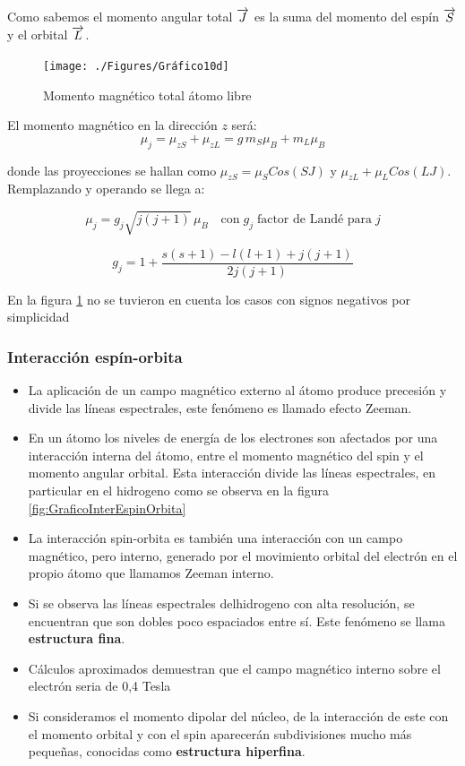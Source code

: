 Como sabemos el momento angular total $\overrightarrow{J}$ es la suma del momento del espín $\overrightarrow{S}$ y el orbital $\overrightarrow{L}$.

\begin{figure}[H]
    \centering
    \texttt{[image: ./Figures/Gráfico10d]}
	\caption{Momento magnético total átomo libre}
	\label{fig:Grafico10d}
\end{figure}


El momento magnético en la dirección $z$ será:
\begin{equation}
	\mu_{j} = \mu_{zS}+\mu_{zL} = g\,m_{S}\mu_{B}+m_{L}\mu_{B}
\end{equation}

donde las proyecciones se hallan como $\mu_{zS}=\mu_{S}Cos(SJ)$ y $\mu_{zL}+\mu_{L}Cos(LJ)$. Remplazando y operando se llega a:

\begin{equation}
	\mu_{j} = g_{j}\sqrt{j(j+1)}\,\mu_{B} \quad \text{con} \; g_{j}\;  \text{factor de Landé para}\; j    
\end{equation}

\begin{equation}
	g_{j} = 1 + \frac{s(s+1)-l(l+1)+j(j+1)}{2j(j+1)}
\end{equation}

En la figura \ref{fig:Grafico10d} no se tuvieron en cuenta los casos con signos negativos por simplicidad

\subsubsection{Interacción espín-orbita}

\begin{itemize}
	\item La aplicación de un campo magnético externo al átomo produce precesión y divide las líneas espectrales, este fenómeno es llamado efecto Zeeman.
	\item En un átomo los niveles de energía de los electrones son afectados por una interacción interna del átomo, entre el momento magnético del spin y el momento angular orbital. Esta interacción divide las líneas espectrales, en particular en el hidrogeno como se observa en la figura \ref{fig:GraficoInterEspinOrbita}
	\item La interacción spin-orbita es también una interacción con un campo magnético, pero interno, generado por el movimiento orbital del electrón en el propio átomo que llamamos Zeeman interno.
	\item Si se observa las líneas espectrales delhidrogeno con alta resolución, se encuentran que son dobles poco espaciados entre sí. Este fenómeno se llama \textbf{estructura fina}.
	\item Cálculos aproximados demuestran que el campo magnético interno sobre el electrón seria de 0,4 Tesla
	\item Si consideramos el momento dipolar del núcleo, de la interacción de este con el momento orbital y con el spin aparecerán subdivisiones mucho más pequeñas, conocidas como \textbf{estructura hiperfina}.
	
\end{itemize}

